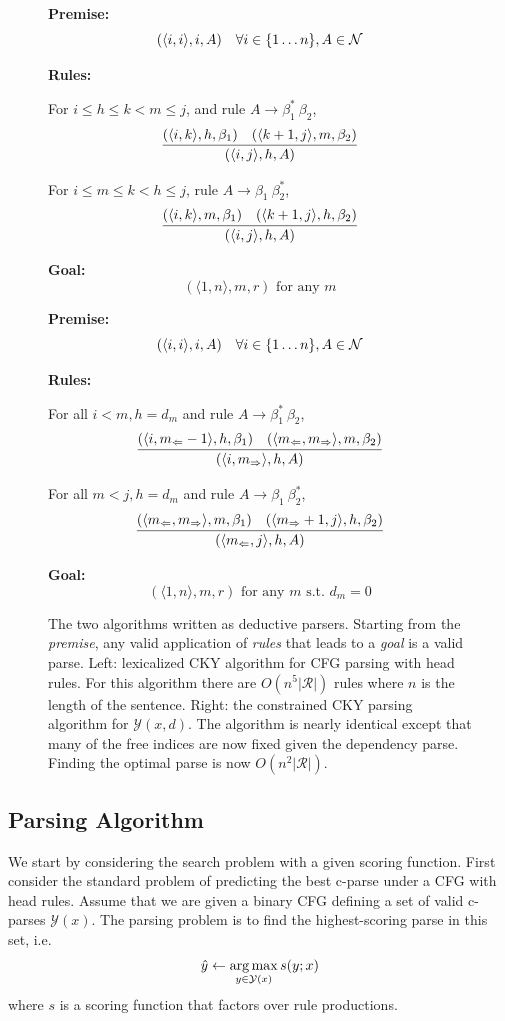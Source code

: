 \documentclass[11pt,letterpaper]{article}
\DeclareMathOperator*{\argmax}{arg\,max}
\newcommand{\rules}{\mathcal{R}}
\newcommand{\Left}[1]{#1_{\Leftarrow}}
\newcommand{\Right}[1]{#1_{\Rightarrow}}
\newcommand{\Span}[1]{\langle #1 \rangle}
\newcommand{\tri}{\langle \Left{m}, \Right{m} \rangle}
\newcommand{\Root}{r}
\newcommand{\RuleA}[3]{#1 \rightarrow #2^*\ #3}
\newcommand{\RuleB}[3]{#1 \rightarrow #2\ #3^*}
\begin{document}
\begin{figure}
  \begin{multicols}{2}
  \noindent \textbf{Premise:}
  \[(\Span{i, i}, i, A)\ \ \ \forall i \in \{1 \ldots n\}, A \in {\cal N}\]

  \noindent\textbf{Rules:}

   For $i\leq h \leq k < m \leq j$,  and  rule  $\RuleA{A}{\beta_1}{\beta_2}$,
   \[\infer{( \Span{i, j},  h,  A)}{( \Span{i, k}, h, \beta_1)  &  ( \Span{k+1, j}, m, \beta_2) } \]

   For $i\leq m \leq k < h \leq j$, rule  $\RuleB{A}{\beta_1}{\beta_2}$,
   \[\infer{(\Span{i, j},  h, A)}{(\Span{i, k}, m, \beta_1)  &  (\Span{k+1, j}, h, \beta_2) }  \]

\noindent \textbf{Goal:}
\[ (\Span{1, n}, m, \Root) \mbox{\ for\ any } m\]

\label{fig:cky}

  \noindent \textbf{Premise:}
  \[(\langle i,i \rangle, i, A)\ \ \ \forall i \in \{1 \ldots n\}, A \in {\cal N}\]

  \noindent\textbf{Rules:}

  For all   $i < m, h = d_m$  and rule  $\RuleA{A}{\beta_1}{\beta_2}$,
  \[\infer{( \Span{i, \Right{m}}, h, A)}{(\Span{i, \Left{m}-1}, h, \beta_1)  &  (\tri, m, \beta_2) } \]

  For all    $m < j, h = d_m$ and  rule  $\RuleB{A}{\beta_1}{\beta_2}$,
  \[ \infer{( \Span{ \Left{m}, j }, h, A)}{(\tri, m, \beta_1)  &  (\Span{\Right{m}+ 1, j}, h, \beta_2) } \]

\noindent \textbf{Goal:}
\[(\Span{1, n}, m, \Root) \mbox{\ for\ any } m \mbox{\ s.t.\ } d_m = 0 \]

\end{multicols}
\caption{The two algorithms written as deductive parsers. Starting
  from the \textit{premise}, any valid application of \textit{rules}
  that leads to a \textit{goal} is a valid parse.  Left: lexicalized CKY
  algorithm for CFG parsing with head rules. For this algorithm there
  are $O(n^5|\rules|)$ rules where $n$ is the length of the
  sentence. Right: the constrained CKY parsing algorithm for
  $\mathcal{Y}(x, d)$. The algorithm is nearly identical except that
  many of the free indices are now fixed given  the dependency
  parse. Finding the optimal parse is now $O(n^2|\rules|)$. \label{fig:cky_new}
}
\end{figure}

\subsection{Parsing Algorithm}
We start by considering the search problem with a given scoring function.
First consider the standard problem of predicting the best c-parse under a CFG with head rules. 
Assume that we are given a binary CFG defining a set of valid c-parses $\mathcal{Y}(x)$.
The parsing problem is to find the highest-scoring parse in this set, i.e.  \[ \hat{y} \gets \argmax_{y \in {\cal Y}(x)} s(y;x) \] where
$s$ is a scoring function that factors over rule productions.
\end{document}
